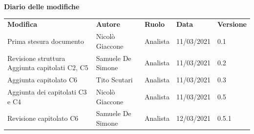 \documentclass[a4paper]{article}
\begin{document}
    \begin{center}

        \textbf{\Large Diario delle modifiche}\\
        \vspace{10px}
        \begin{table}[h!]
        \centering
        \renewcommand{\arraystretch}{1.8}
        \begin{tabular}{p{150px} p{90px} p{50px} p{60px} p{45px}}
            \rowcolor{logo!70} \textbf{Modifica} & \textbf{Autore} & \textbf{Ruolo} & \textbf{Data} & \textbf{Versione}\\
            Prima stesura documento & Nicolò Giaccone & Analista & 11/03/2021 & 0.1\\
            Revisione struttura \newline Aggiunta capitolati C2, C5 & Samuele De Simone & Analista & 11/03/2021 & 0.2\\
            Aggiunta capitolato C6 & Tito Scutari & Analista & 11/03/2021 & 0.3 \\
            Aggiunta dei capitolati C3 e C4 & Nicolò Giaccone & Analista & 11/03/2021 & 0.5\\
            Revisione capitolato C6 & Samuele De Simone & Analista & 12/03/2021 & 0.5.1
        \end{tabular}
    \end{table}
    \end{center}
    \newpage
\tableofcontents
\newpage








\end{document}
